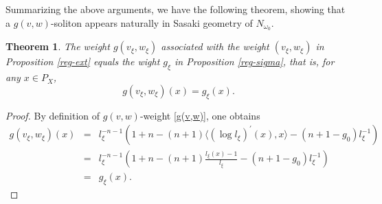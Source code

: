 \documentclass[12pt]{amsart}
\numberwithin{equation}{section}%
\theoremstyle{plain}
\newtheorem{theorem}{Theorem}[section]
\theoremstyle{definition}
\newcommand{\1}{\mathbf{1}}
\begin{document}
Summarizing the above arguments,
we have the following theorem, showing that
a $g(v,w)$-soliton appears naturally in Sasaki geometry of $N_{\omega_{0}}$.

\begin{theorem}\label{Sasaki g(v,w)}
The weight $g(v_{\xi},w_{\xi})$ associated with the weight
$(v_{\xi},w_{\xi})$ in Proposition \ref{reg-ext} equals
the wight $g_{\xi}$ in Proposition
\ref{reg-sigma},
that is,
for any $x\in P_{X}$,
\begin{equation}
g(v_{\xi},w_{\xi})(x)=g_{\xi}(x).
\end{equation}
\end{theorem}
\begin{proof}
By definition of $g(v,w)$-weight \eqref{g(v,w)}, one obtains
\begin{eqnarray*}
g(v_{\xi},w_{\xi})(x)
&=&
l_{\xi}^{-n-1}\left( 1+n -(n+1)\langle (\log l_{\xi})^{\prime}(x),x\rangle
-\left(n+1-g_{0}\right)l_{\xi}^{-1}\right) \\
&=&
l_{\xi}^{-n-1}\left( 1+n -(n+1)\frac{l_{\xi}(x)-1}{l_{\xi}}
-\left(n+1-g_{0}\right)l_{\xi}^{-1}\right) \\
&=&g_{\xi}(x).
\end{eqnarray*}
\end{proof}
\end{document}

